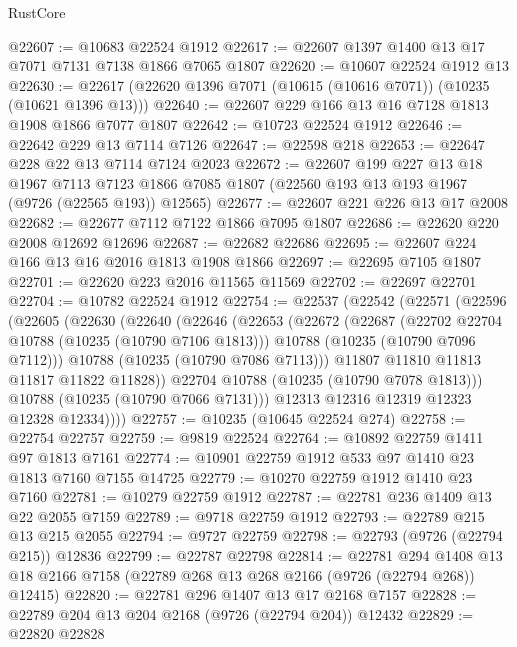 \begin{lexlean}{RustCore}
\begin{coremodule}
@22607 := @10683 @22524 @1912
@22617 := @22607 @1397 @1400 @13 @17 @7071 @7131 @7138 @1866 @7065 @1807
@22620 := @10607 @22524 @1912 @13
@22630 := @22617 (@22620 @1396 @7071 (@10615 (@10616 @7071)) (@10235 (@10621 @1396 @13)))
@22640 := @22607 @229 @166 @13 @16 @7128 @1813 @1908 @1866 @7077 @1807
@22642 := @10723 @22524 @1912
@22646 := @22642 @229 @13 @7114 @7126
@22647 := @22598 @218
@22653 := @22647 @228 @22 @13 @7114 @7124 @2023
@22672 := @22607
    @199
    @227
    @13
    @18
    @1967
    @7113
    @7123
    @1866
    @7085
    @1807
    (@22560 @193 @13 @193 @1967 (@9726 (@22565 @193)) @12565)
@22677 := @22607 @221 @226 @13 @17 @2008
@22682 := @22677 @7112 @7122 @1866 @7095 @1807
@22686 := @22620 @220 @2008 @12692 @12696
@22687 := @22682 @22686
@22695 := @22607 @224 @166 @13 @16 @2016 @1813 @1908 @1866
@22697 := @22695 @7105 @1807
@22701 := @22620 @223 @2016 @11565 @11569
@22702 := @22697 @22701
@22704 := @10782 @22524 @1912
@22754 := @22537
    (@22542
      (@22571
        (@22596
          (@22605
            (@22630
              (@22640
                (@22646
                  (@22653
                    (@22672
                      (@22687
                        (@22702 @22704 @10788 (@10235 (@10790 @7106 @1813)))
                        @10788
                        (@10235 (@10790 @7096 @7112)))
                      @10788
                      (@10235 (@10790 @7086 @7113)))
                    @11807
                    @11810
                    @11813
                    @11817
                    @11822
                    @11828))
                @22704
                @10788
                (@10235 (@10790 @7078 @1813)))
              @10788
              (@10235 (@10790 @7066 @7131)))
            @12313
            @12316
            @12319
            @12323
            @12328
            @12334))))
@22757 := @10235 (@10645 @22524 @274)
@22758 := @22754 @22757
@22759 := @9819 @22524
@22764 := @10892 @22759 @1411 @97 @1813 @7161
@22774 := @10901 @22759 @1912 @533 @97 @1410 @23 @1813 @7160 @7155 @14725
@22779 := @10270 @22759 @1912 @1410 @23 @7160
@22781 := @10279 @22759 @1912
@22787 := @22781 @236 @1409 @13 @22 @2055 @7159
@22789 := @9718 @22759 @1912
@22793 := @22789 @215 @13 @215 @2055
@22794 := @9727 @22759
@22798 := @22793 (@9726 (@22794 @215)) @12836
@22799 := @22787 @22798
@22814 := @22781
    @294
    @1408
    @13
    @18
    @2166
    @7158
    (@22789 @268 @13 @268 @2166 (@9726 (@22794 @268)) @12415)
@22820 := @22781 @296 @1407 @13 @17 @2168 @7157
@22828 := @22789 @204 @13 @204 @2168 (@9726 (@22794 @204)) @12432
@22829 := @22820 @22828

\end{coremodule}
\end{lexlean}
